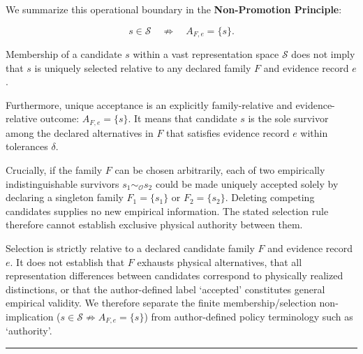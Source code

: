 \documentclass[
  10pt,
]{article}
\begin{document}
We summarize this operational boundary in the \textbf{Non-Promotion Principle}:

\hypertarget{math-E0171-0231}{}{\[\boxed{
s \in \mathcal{S} \quad\not\Longrightarrow\quad A_{F,e} = \{s\}.
}\]}

Membership of a candidate \hypertarget{math-E0146-0232}{}{\(s\)} within a vast representation space \hypertarget{math-E0012-0233}{}{\(\mathcal{S}\)} does not imply that \hypertarget{math-E0146-0234}{}{\(s\)} is uniquely selected relative to any declared family \hypertarget{math-E0005-0235}{}{\(F\)} and evidence record \hypertarget{math-E0006-0236}{}{\(e\)}.

Furthermore, unique acceptance is an explicitly family-relative and evidence-relative outcome: \hypertarget{math-E0172-0237}{}{\(A_{F,e} = \{s\}\)}. It means that candidate \hypertarget{math-E0146-0238}{}{\(s\)} is the sole survivor among the declared alternatives in \hypertarget{math-E0005-0239}{}{\(F\)} that satisfies evidence record \hypertarget{math-E0006-0240}{}{\(e\)} within tolerances \hypertarget{math-E0173-0241}{}{\(\delta\)}.

Crucially, if the family \hypertarget{math-E0005-0242}{}{\(F\)} can be chosen arbitrarily, each of two empirically indistinguishable survivors \hypertarget{math-E0026-0243}{}{\(s_1 \sim_{\mathcal{O}} s_2\)} could be made uniquely accepted solely by declaring a singleton family \hypertarget{math-E0174-0244}{}{\(F_1 = \{s_1\}\)} or \hypertarget{math-E0175-0245}{}{\(F_2 = \{s_2\}\)}. Deleting competing candidates supplies no new empirical information. The stated selection rule therefore cannot establish exclusive physical authority between them.

Selection is strictly relative to a declared candidate family \hypertarget{math-E0005-0246}{}{\(F\)} and evidence record \hypertarget{math-E0006-0247}{}{\(e\)}. It does not establish that \hypertarget{math-E0005-0248}{}{\(F\)} exhausts physical alternatives, that all representation differences between candidates correspond to physically realized distinctions, or that the author-defined label `accepted' constitutes general empirical validity. We therefore separate the finite membership/selection non-implication (\hypertarget{math-E0176-0249}{}{\(s \in \mathcal{S} \not\Longrightarrow A_{F,e} = \{s\}\)}) from author-defined policy terminology such as `authority'.

\begin{center}\rule{0.5\linewidth}{0.5pt}\end{center}
\end{document}
